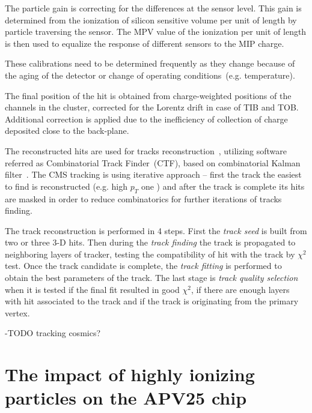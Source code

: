 The particle gain is correcting for the differences at the sensor level. This gain is determined from the ionization of silicon sensitive volume per unit of length by particle traversing the sensor. The MPV value of the ionization per unit of length is then used to equalize the response of different sensors to the MIP charge. 

These calibrations need to be determined frequently as they change because of the aging of the detector or change of operating conditions~(e.g. temperature).

The final position of the hit is obtained from charge-weighted positions of the channels in the cluster, corrected for the Lorentz drift in case of TIB and TOB. Additional correction is applied due to the inefficiency of collection of charge deposited close to the back-plane. 

The reconstructed hits are used for tracks reconstruction~\cite{Chatrchyan:2014fea}, utilizing software referred as Combinatorial Track Finder~(CTF), based on combinatorial Kalman filter~\cite{Fruhwirth:1987fm}. The CMS tracking is using iterative approach -- first the track the easiest to find is reconstructed (e.g. high $p_{T}$ one ) and after the track is complete its hits are masked in order to reduce combinatorics for further iterations of tracks finding.


The track reconstruction is performed in 4 steps. First the \textit{track seed} is built from two or three 3-D hits. Then during the \textit{track finding} the track is propagated to neighboring layers of tracker, testing the compatibility of hit with the track by $\chi^{2}$ test. Once the track candidate is complete, the \textit{track fitting} is performed to obtain the best parameters of the track. The last stage is \textit{track quality selection} when it is tested if the final fit resulted in good $\chi^{2}$, if there are enough layers with hit associated to the track and if the track is originating from the primary vertex.

-TODO tracking cosmics?

\section{The impact of highly ionizing particles on the APV25 chip}



